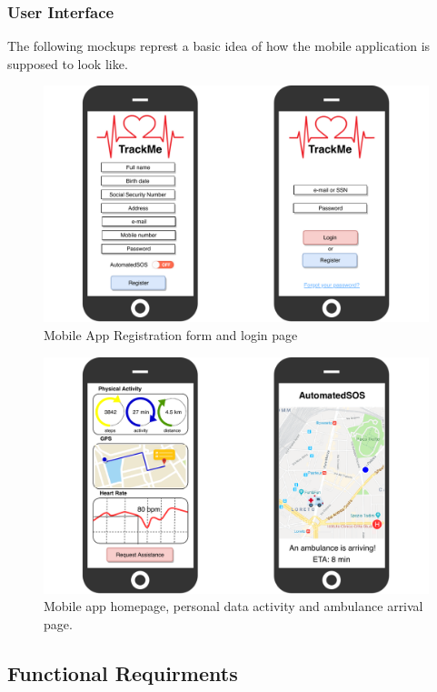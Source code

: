 \documentclass[12pt,a4paper]{article}
\begin{document}
	\subsubsection{User Interface}
	The following mockups represt a basic idea of how the mobile application is supposed to look like.\\
	\begin{figure}[h]
		\centering
		\includegraphics[width=1.0\linewidth]{Images/login-registration}
		\caption{Mobile App Registration form and login page}
		\label{fig:login-registration}
	\end{figure}
	\begin{figure}
		\centering
		\includegraphics[width=1.0\linewidth]{Images/pages}
		\caption{Mobile app homepage, personal data activity and ambulance arrival page.}
		\label{fig:pages}
	\end{figure}
	
	\newpage
	
	\subsection{Functional Requirments}
\end{document}
